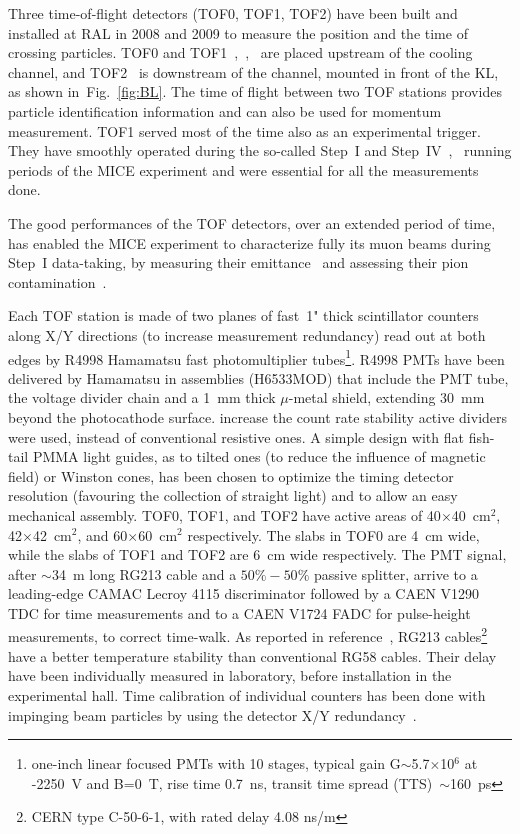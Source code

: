 Three time-of-flight detectors (TOF0, TOF1, TOF2) have been built and
installed at RAL in 2008 and 2009 to measure the position and the time
of crossing particles.  TOF0 and
TOF1~\cite{NOTE145},~\cite{NOTE241},~\cite{2010NIMPA.615...14B} are
placed upstream of the cooling channel, and TOF2~\cite{NOTE286} is
downstream of the channel, mounted in front of the KL, as shown
in~Fig.~\ref{fig:BL}.  The time of flight between two TOF stations
provides particle identification information and can also be used for
momentum measurement. TOF1 served most of the time also as an
experimental trigger.  They have smoothly operated during the
so-called Step~I and
Step~IV~\cite{Rajaram:2015bra},~\cite{2015ehep.confE.521B} running
periods of the MICE experiment and were essential for all the
measurements done.

The good performances of the TOF detectors, over an extended period of time,
has enabled the MICE experiment to characterize fully its muon beams during
Step~I data-taking, by measuring their emittance~\cite{2013arXiv1306.1509T} and
assessing their pion contamination~\cite{2016JInst..11P3001A}.

Each TOF station is made of two planes of fast~1" thick scintillator
counters along X/Y directions (to increase measurement redundancy)
read out at both edges by R4998 Hamamatsu fast photomultiplier
tubes\footnote{one-inch linear focused PMTs with 10 stages, typical
  gain G$\sim$5.7$\times$10$^6$ at -2250~V and B=0~T, rise time
  0.7~ns, transit time spread (TTS)~$\sim$160~ps}.  R4998 PMTs have
been delivered by Hamamatsu in assemblies (H6533MOD) that include the
PMT tube, the voltage divider chain and a 1~mm thick $\mu$-metal
shield, extending 30~mm beyond the photocathode surface.
 increase the count rate stability active dividers
were used, instead of conventional resistive ones.  A simple design
with flat fish-tail PMMA light guides, as 
to tilted ones (to reduce the influence of magnetic field) or Winston
cones, has been chosen to optimize the timing detector resolution
(favouring the collection of straight light) and to allow an easy
mechanical assembly.   TOF0,
TOF1, and TOF2 have active areas of 40$\times$40~cm$^2$,
42$\times$42~cm$^2$, and 60$\times$60~cm$^2$ respectively.  The slabs
in TOF0 are 4~cm wide, while the slabs of TOF1 and TOF2 are 6~cm wide
respectively.  The PMT signal, after $\sim$34~m long
RG213 cable and a $50\%-50\%$ passive splitter, arrive to a
leading-edge CAMAC Lecroy 4115 discriminator followed by a CAEN V1290
TDC for time measurements and to a CAEN V1724 FADC for pulse-height
measurements, to correct time-walk. As reported in
reference~\cite{NOTE241}, RG213 cables\footnote{CERN type C-50-6-1,
  with rated delay 4.08 ns/m} have a better temperature stability than
conventional RG58 cables. Their delay have been individually measured
in laboratory, before installation in the experimental hall.  Time
calibration of individual counters has been done with impinging beam
particles by using the detector X/Y
redundancy~\cite{NOTE251}. 

